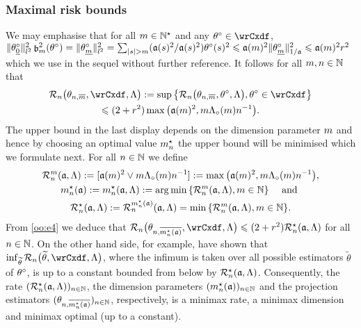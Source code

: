 \subsubsection{Maximal risk bounds}
We may emphasise that for all $\Di\in\Nz^{\star}$ and  any $\xdf\in\rwCxdf$, $\Vnormlp{\xdf_{\underline{0}}}^2\bias^2(\xdf)=\Vnormlp{\xdf_{\underline{\Di}}}^2=\sum_{ \vert s \vert >\Di}(\xdfCw[(s)]^2/\xdfCw[(s)]^2)\fxdf[(s)]^2\leq
\xdfCw[(\Di)]^2\Vnorm[1/{\xdfCw[]}]{\xdf_{\underline{\Di}}}^2\leq
\xdfCw[(\Di)]^2\xdfCr^2$ which we use in the sequel
without further reference.
It follows for all $\Di,\ssY\in\Nz$ that 
  \begin{multline}
\nRi{\txdfPr}{\rwCxdf,\Lambda}:=\sup\set{\nRi{\txdfPr}{\xdf,\Lambda},\xdf\in\rwCxdf}\\
\leq (2+\xdfCr^2)\max\big(\xdfCw^2,\Di \oiSv \ssY^{-1}\big).
\end{multline}
The upper bound in the last display depends on the dimension parameter
$\Di$ and hence by choosing an optimal value $\mnDi$ the upper bound
will be minimised which we formulate next. For all $n\in\Nz$ we define
\begin{multline}
 \dRa{\Di}{\xdfCw[],\Lambda}:=[\xdfCw^2\vee\Di\oiSv \ssY^{-1}]:=\max\big(\xdfCw^2,\Di \oiSv \ssY^{-1}\big),\\
\hfill \mnDi(\xdfCw[]):=\mnDi(\xdfCw[],\Lambda):=\argmin\Nset[{\Di\in\Nz}]{\dRa{\Di}{\xdfCw[],\Lambda}}\quad\text{ and }\hfill\\\mnRa{\xdfCw[],\Lambda}:=\dRa{\mnDi({\xdfCw[]})}{\xdfCw[],\Lambda}=\min\Nset[{\Di\in\Nz}]{\dRa{\Di}{\xdfCw[],\Lambda}}.
\end{multline}
From \eqref{oo:e4} we deduce that
$\nRi{\txdfPr[\mnDi({\xdfCw[]})]}{\rwCxdf,\Lambda}\leq(2+\xdfCr^2)\mnRa{\xdfCw[],\Lambda}$ for
all $n\in\Nz$. On the other
  hand side, for example,  have shown  that
  $\inf_{\widetilde{\theta}}\nRi{\widetilde{\theta}}{\rwCxdf,\Lambda}$, where the infimum is taken over all
  possible estimators $\widetilde{\theta}$ of $\xdf$, is up to a constant bounded
  from below by $\mnRa{\xdfCw[],\Lambda}$.  Consequently, the rate
  $\Nsuite[n]{\mnRa{\xdfCw[],\Lambda}}$, the dimension parameters $\Nsuite[n]{\mnDi(\xdfCw[])}$
  and the projection estimators $\Nsuite[n]{\txdfPr[\mnDi({\xdfCw[]})]}$, respectively, is a
  minimax rate, a minimax dimension and minimax optimal (up to a
  constant).

